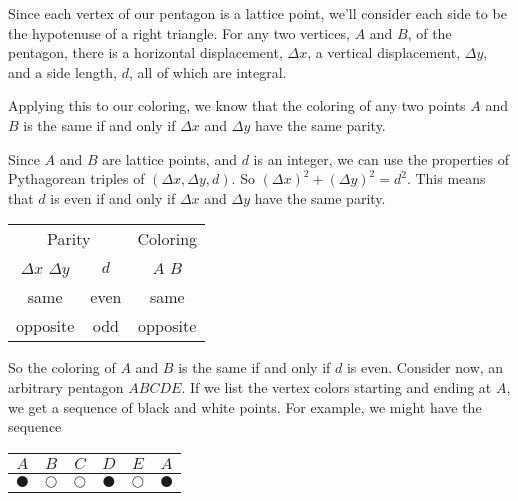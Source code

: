 \documentclass[12pt]{article}
\begin{document}
Since each vertex of our pentagon is a lattice point, we'll consider each side to be the hypotenuse of a right triangle. For any two vertices, $A$ and $B$, of the pentagon, there is a horizontal displacement, $\Delta x$, a vertical displacement, $\Delta y$, and a side length, $d$, all of which are integral.
\begin{center}
\end{center}

Applying this to our coloring, we know that the coloring of any two points $A$ and $B$ is the same if and only if $\Delta x$ and $\Delta y$ have the same parity.

Since $A$ and $B$ are lattice points, and $d$ is an integer, we can use the properties of Pythagorean triples of $(\Delta x, \Delta y, d)$. So $(\Delta x)^2 + (\Delta y)^2 = d^2$. This means that $d$ is even if and only if $\Delta x$ and $\Delta y$ have the same parity.
\begin{center}
    \begin{tabular}{cc|c}
        \multicolumn{2}{c}{Parity} & \multicolumn{1}{c}{Coloring} \\
        $\Delta x$ $\Delta y$ & $d$ & $A$  $B$\\
        \hline
        same & even & same \\
        opposite & odd & opposite \\
    \end{tabular}
\end{center}

So the coloring of $A$ and $B$ is the same if and only if $d$ is even. Consider now, an arbitrary pentagon $ABCDE$. If we list the vertex colors starting and ending at $A$, we get a sequence of black and white points. For example, we might have the sequence
\begin{center}
    \begin{tabular}{cccccc}
        $A$ & $B$ & $C$ & $D$ & $E$ & $A$ \\
        \hline
        $\CIRCLE$ & $\Circle$ & $\Circle$ & $\CIRCLE$ & $\Circle$ & $\CIRCLE$
    \end{tabular}
\end{center}
\end{document}
